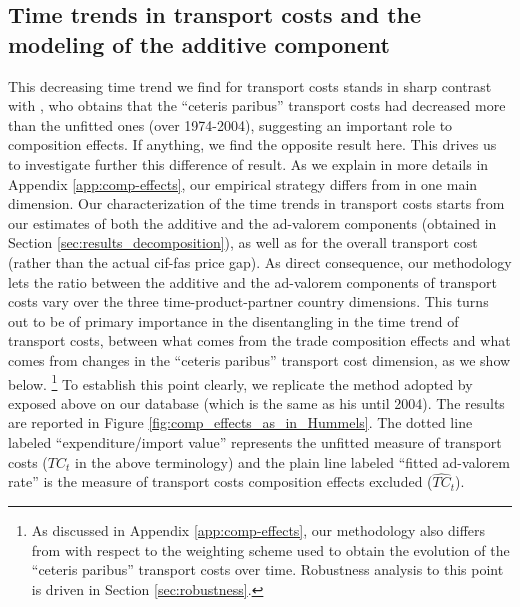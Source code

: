 \documentclass[a4paper,11pt]{article}
\begin{document}
\subsection{Time trends in transport costs and the modeling of the additive component}

This decreasing time trend we find for transport costs stands in sharp contrast with \citet{hummels2007}, who obtains that the ``ceteris paribus'' transport costs had decreased more than the unfitted ones (over 1974-2004), suggesting an important role to composition effects. If anything, we find the opposite result here. This drives us to investigate further this difference of result. As we explain in more details in Appendix \ref{app:comp-effects}, our empirical strategy differs from \cite{hummels2007} in one main dimension. Our characterization of the time trends in transport costs starts from our estimates of both the additive and the ad-valorem components (obtained in Section \ref{sec:results_decomposition}), as well as for the overall transport cost (rather than the actual cif-fas price gap). As direct consequence, our methodology lets the ratio between the additive and the ad-valorem components of transport costs vary over the three time-product-partner country dimensions. %
This turns out to be of primary importance in the disentangling in the time trend of transport costs, between what comes from the trade composition effects and what comes from changes in the ``ceteris paribus'' transport cost dimension, as we show below. \footnote{As discussed in Appendix \ref{app:comp-effects}, our methodology also differs from  \citet{hummels2007} with respect to the weighting scheme used to obtain the evolution of the ``ceteris paribus'' transport costs over time. Robustness analysis to this point is driven in Section \ref{sec:robustness}.} To establish this point clearly, we replicate the method adopted by \cite{hummels2007} exposed above on our database (which is the same as his until 2004). The results are reported in Figure \ref{fig:comp_effects_as_in_Hummels}. The dotted line labeled ``expenditure/import value'' represents the unfitted measure of transport costs ($TC_t$ in the above terminology) and the plain line labeled ``fitted ad-valorem rate'' is the measure of transport costs composition effects excluded ($\widehat{TC}_t$).
\end{document}
